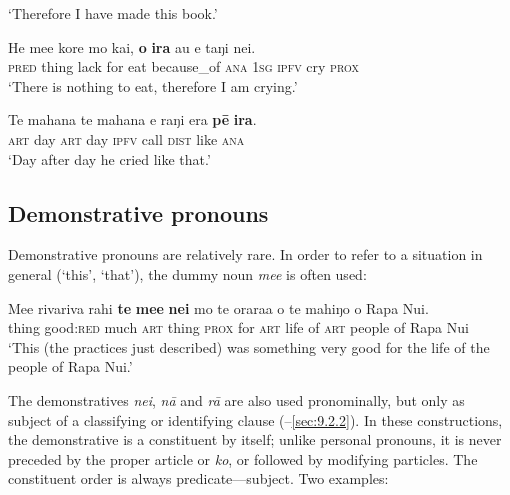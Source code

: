 \glt 
‘Therefore I have made this book.’ \textstyleExampleref{[R531.014]} 
\z

\ea\label{ex:4.236}
\gll He me{\ꞌ}e kore mo kai, \textbf{{\ꞌ}o} \textbf{ira} au e taŋi nei. \\
\textsc{pred} thing lack for eat because\_of \textsc{ana} \textsc{1sg} \textsc{ipfv} cry \textsc{prox} \\

\glt 
‘There is nothing to eat, therefore I am crying.’ \textstyleExampleref{[R349.013]} 
\z

\ea\label{ex:4.237}
\gll Te mahana te mahana e raŋi era \textbf{pē} \textbf{ira}. \\
\textsc{art} day \textsc{art} day \textsc{ipfv} call \textsc{dist} like \textsc{ana} \\

\glt 
‘Day after day he cried like that.’ \textstyleExampleref{[R213.003]} 
\z
{}
\subsection{Demonstrative pronouns}\label{sec:4.6.6}

Demonstrative pronouns are relatively rare. In order to refer to a situation in general (‘this’, ‘that’), the dummy noun \textit{me{\ꞌ}e} is often used:

\ea\label{ex:4.238}
\gll Me{\ꞌ}e rivariva rahi \textbf{te} \textbf{me{\ꞌ}e} \textbf{nei} mo te orara{\ꞌ}a o te mahiŋo o Rapa Nui. \\
thing good:\textsc{red} much \textsc{art} thing \textsc{prox} for \textsc{art} life of \textsc{art} people of Rapa Nui \\

\glt 
‘This (the practices just described) was something very good for the life of the people of Rapa Nui.’ \textstyleExampleref{[R231.314]} 
\z

The demonstratives \textit{nei}, \textit{nā} and \textit{rā} are also used pronominally, but only as subject of a classifying or identifying clause (–\ref{sec:9.2.2}). In these constructions, the demonstrative is a constituent by itself; unlike personal pronouns, it is never preceded by the proper article or \textit{ko}, or followed by modifying particles. The constituent order is always predicate—subject. Two examples:


